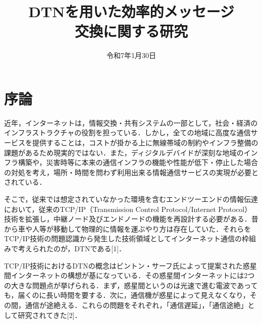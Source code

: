 \documentclass[11pt]{icsthesis}
\title{DTNを用いた効率的メッセージ\\交換に関する研究}
\date{令和7年1月30日}
\begin{document}
\maketitle
\pagestyle{fancy}
\fancyhead[R]{\nouppercase{\fontsize{10.5pt}{0pt}\selectfont\rightmark}}
\fancyhead[L]{\nouppercase{\fontsize{10.5pt}{0pt}\selectfont\leftmark}}
\fancyfoot[C]{--\ \thepage\ --}
\renewcommand{\headrulewidth}{0.3truemm}
\setcounter{tocdepth}{4}
\pagestyle{fancy}
\fancyfoot[C]{--\ \thepage\ --}
{\makeatletter
\let\ps@jpl@in\ps@empty
\makeatother
\pagestyle{plain}
\tableofcontents
\clearpage}

\chapter{序論}
近年，インターネットは，情報交換・共有システムの一部として，社会・経済のインフラストラクチャの役割を担っている．しかし，全ての地域に高度な通信サービスを提供することは，コストが掛かる上に無線帯域の制約やインフラ整備の課題があるため現実的ではない．また，ディジタルデバイドが深刻な地域のインフラ構築や，災害時等に本来の通信インフラの機能や性能が低下・停止した場合の対処を考え，場所・時間を問わず利用出来る情報通信サービスの実現が必要とされている．

そこで，従来では想定されていなかった環境を含むエンドツーエンドの情報伝達において，従来のTCP/IP（Transmission Control Protocol/Internet Protocol）技術を拡張し，中継ノード及びエンドノードの機能を再設計する必要がある．昔から車や人等が移動して物理的に情報を運ぶやり方は存在していた．それらをTCP/IP技術の問題認識から発生した技術領域としてインターネット通信の枠組みで考えられたのが，DTNである[1]．

TCP/IP技術におけるDTNの概念はビントン・サーフ氏によって提案された惑星間インターネットの構想が基になっている．その惑星間インターネットには2つの大きな問題点が挙げられる．まず，惑星間というのは光速で進む電波であっても，届くのに長い時間を要する．次に，通信機が惑星によって見えなくなり，その間，通信が途絶える．これらの問題をそれぞれ，「通信遅延」，「通信途絶」として研究されてきた[2]．
\end{document}
